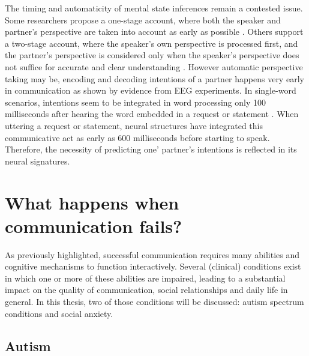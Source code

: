 The timing and automaticity of mental state inferences remain a contested issue. Some researchers propose a one-stage account, where both the speaker and partner's perspective are taken into account as early as possible \citep{brennan2009}. Others support a two-stage account, where the speaker's own perspective is processed first, and the partner's perspective is considered only when the speaker's perspective does not suffice for accurate and clear understanding \citep{barr2002}. However automatic perspective taking may be, encoding and decoding intentions of a partner happens very early in communication as shown by evidence from EEG experiments. In single-word scenarios, intentions seem to be integrated in word processing only 100 milliseconds after hearing the word embedded in a request or statement \citep{tomasello2022}. When uttering a request or statement, neural structures have integrated this communicative act as early as 600 milliseconds before starting to speak. Therefore, the necessity of predicting one' partner's intentions is reflected in its neural signatures.

\section*{What happens when communication fails?}

As previously highlighted, successful communication requires many abilities and cognitive mechanisms to function interactively. Several (clinical) conditions exist in which one or more of these abilities are impaired, leading to a substantial impact on the quality of communication, social relationships and daily life in general. In this thesis, two of those conditions will be discussed: autism spectrum conditions and social anxiety.  

\subsection*{Autism}

